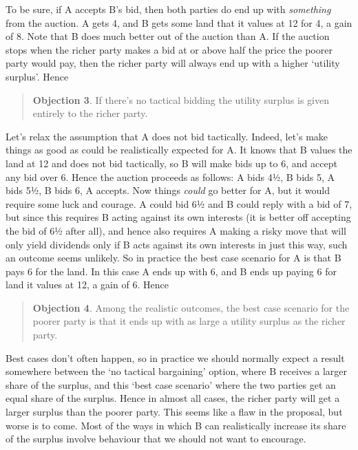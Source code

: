 \documentclass[
  11pt,
  letterpaper,
  DIV=11,
  numbers=noendperiod,
  twoside]{scrartcl}
\begin{document}
To be sure, if A accepts B's bid, then both parties do end up with
\emph{something} from the auction. A gets 4, and B gets some land that
it values at 12 for 4, a gain of 8. Note that B does much better out of
the auction than A. If the auction stops when the richer party makes a
bid at or above half the price the poorer party would pay, then the
richer party will always end up with a higher `utility surplus'. Hence

\begin{quote}
\textbf{Objection 3}. If there's no tactical bidding the utility surplus
is given entirely to the richer party.
\end{quote}

Let's relax the assumption that A does not bid tactically. Indeed, let's
make things as good as could be realistically expected for A. It knows
that B values the land at 12 and does not bid tactically, so B will make
bids up to 6, and accept any bid over 6. Hence the auction proceeds as
follows: A bids 4½, B bids 5, A bids 5½, B bids 6, A accepts. Now things
\emph{could} go better for A, but it would require some luck and
courage. A could bid 6½ and B could reply with a bid of 7, but since
this requires B acting against its own interests (it is better off
accepting the bid of 6½ after all), and hence also requires A making a
risky move that will only yield dividends only if B acts against its own
interests in just this way, such an outcome seems unlikely. So in
practice the best case scenario for A is that B pays 6 for the land. In
this case A ends up with 6, and B ends up paying 6 for land it values at
12, a gain of 6. Hence

\begin{quote}
\textbf{Objection 4}. Among the realistic outcomes, the best case
scenario for the poorer party is that it ends up with as large a utility
surplus as the richer party.
\end{quote}

Best cases don't often happen, so in practice we should normally expect
a result somewhere between the `no tactical bargaining' option, where B
receives a larger share of the surplus, and this `best case scenario'
where the two parties get an equal share of the surplus. Hence in almost
all cases, the richer party will get a larger surplus than the poorer
party. This seems like a flaw in the proposal, but worse is to come.
Most of the ways in which B can realistically increase its share of the
surplus involve behaviour that we should not want to encourage.
\end{document}

